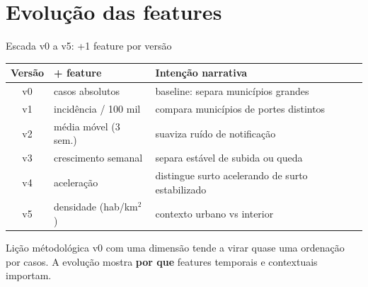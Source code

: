 \documentclass[aspectratio=169,xcolor=table]{beamer}
\begin{document}
\section{Evolu\c{c}\~ao das features}
\sectionframe

\begin{frame}{Escada v0 a v5: +1 feature por vers\~ao}
    \small
    \begin{tabular}{clp{}}
        \toprule
        \textbf{Vers\~ao} & \textbf{+ feature} & \textbf{Inten\c{c}\~ao narrativa} \\
        \midrule
        v0 & casos absolutos & baseline: separa munic\'ipios grandes \\
        v1 & incid\^encia / 100 mil & compara munic\'ipios de portes distintos \\
        v2 & m\'edia m\'ovel (3 sem.) & suaviza ru\'ido de notifica\c{c}\~ao \\
        v3 & crescimento semanal & separa est\'avel de subida ou queda \\
        v4 & acelera\c{c}\~ao & distingue surto acelerando de surto estabilizado \\
        v5 & densidade (hab/km$^2$) & contexto urbano vs interior \\
        \bottomrule
    \end{tabular}

    \vspace{0.5em}
    \begin{alertblock}{Li\c{c}\~ao m\'etodol\'ogica}
        v0 com uma dimens\~ao tende a virar quase uma ordena\c{c}\~ao por casos. A evolu\c{c}\~ao mostra \textbf{por que} features temporais e contextuais importam.
    \end{alertblock}
\end{frame}
\end{document}
